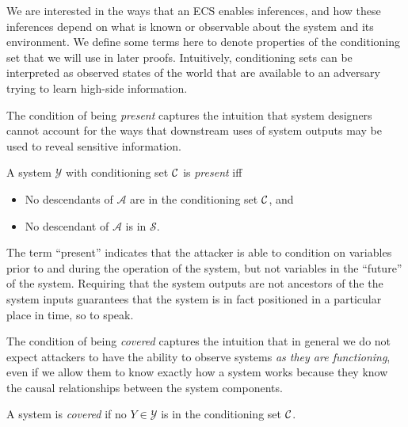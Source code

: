 \documentclass[../thesis.tex]{subfiles}
\begin{document}
%

We are interested in the ways that an ECS
enables inferences, and how these inferences
depend on what is known or observable about
the system and its environment.
We define some terms here to denote properties
of the conditioning set that we will use in
later proofs.
Intuitively, conditioning sets can be interpreted
as observed states of the world that are available
to an adversary trying to learn high-side information.

The condition of being \emph{present} captures the
intuition that system designers cannot account for
the ways that downstream uses of system outputs
may be used to reveal sensitive information.

\begin{dfn}[Present]
  A system $\mathcal{Y}$ with conditioning set $\mathcal{C}$ is \emph{present}
   iff
  \begin{itemize}
  \item No descendants of $\mathcal{A}$ are in the
    conditioning set $\mathcal{C}$, and
  \item No descendant of $\mathcal{A}$ is in
    $\mathcal{S}$.
  \end{itemize}
\end{dfn}

The term ``present'' indicates that the attacker
is able to condition on variables prior to and
during the operation of the system, but not
variables in the ``future'' of the system.
Requiring that the system outputs are not ancestors of
the the system inputs guarantees that the system is
in fact positioned in a particular place in time,
so to speak.

The condition of being \emph{covered} captures the intuition
that in general we do not expect attackers to have
the ability to observe systems 
\emph{as they are functioning}, even if we allow them
to know exactly how a system works because
they know the causal relationships between the
system components.

\begin{dfn}[Covered]
  \label{def:covered-system}
  A system is \emph{covered} if no $Y \in \mathcal{Y}$
  is in the conditioning set $\mathcal{C}$.
\end{dfn}
\end{document}
